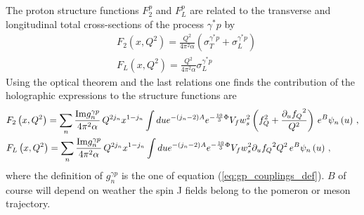 \documentclass[a4paper,12pt]{article}
\begin{document}
The proton structure functions $F^p_2$ and $F^p_L$ are related to the transverse and longitudinal total cross-sections of the process $\gamma^{*} p$ by
\begin{align}
&F_2\left(x, Q^2\right) = \frac{Q^2}{4 \pi^2 \alpha} \left(\sigma_T^{\gamma^* p} + \sigma_L^{\gamma^* p} \right) \\
&F_L\left(x, Q^2\right) = \frac{Q^2}{4 \pi^2 \alpha} \sigma_L^{\gamma^* p} 
\end{align}
Using the optical theorem and the last relations one finds the contribution of the holographic expressions to the structure functions are
\begin{align}
&F_2\left(x, Q^2\right) = \sum_n \frac{{\rm Im} g^{\gamma p}_n}{4 \pi^2 \alpha} \, Q^{2 j_n} x^{1-j_n}  \int du e^{-\left(j_n - 2 \right)A } e^{-\frac{10}{3} \Phi} V_f w_s^2  \left(f_Q^2 +\frac{\partial_u{f_Q}^2}{Q^2} \right) \, e^B \psi_n\left(u\right) \, \label{eq:hol_f2} , \\
&F_L\left(x, Q^2\right) = \sum_n \frac{{\rm Im} g^{\gamma p}_n}{4 \pi^2 \alpha} \, Q^{2 j_n} x^{1-j_n}  \int du e^{-\left(j_n - 2 \right)A } e^{-\frac{10}{3} \Phi} V_f w_s^2 {\partial_u{f_Q}^2}{Q^2} \, e^B \psi_n\left(u\right) \, \label{eq:hol_fl} ,
\end{align}
where the definition of $g^{\gamma p}_n$ is the one of equation (\ref{eq:gp_couplings_def}). $B$ of course will depend on weather the spin J fields belong to the pomeron or meson trajectory.
\end{document}
